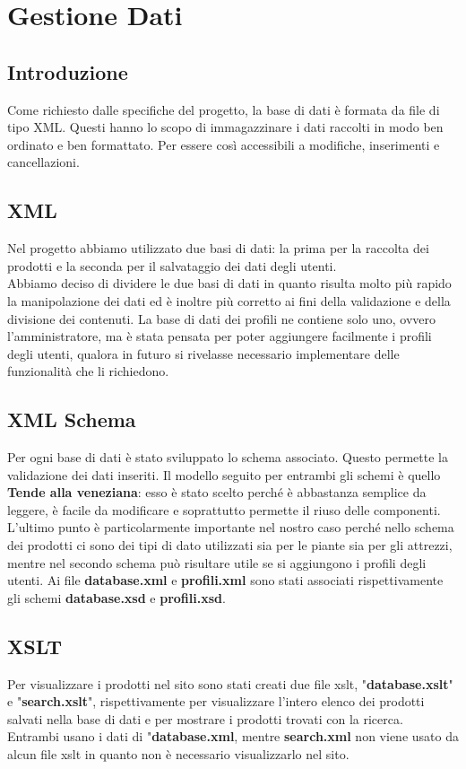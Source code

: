 \section{Gestione Dati}{
	\subsection{Introduzione}
	Come richiesto dalle specifiche del progetto, la base di dati è formata da file di tipo XML. Questi hanno lo scopo di immagazzinare i dati raccolti in modo ben ordinato e ben formattato. Per essere così accessibili a modifiche, inserimenti e cancellazioni.
	\subsection{XML}
	Nel progetto abbiamo utilizzato due basi di dati: la prima per la raccolta dei prodotti e la seconda per il salvataggio dei dati degli utenti.\\
Abbiamo deciso di dividere le due basi di dati in quanto risulta molto più rapido la manipolazione dei dati
ed è inoltre più corretto ai fini della validazione e della divisione dei contenuti.
La base di dati dei profili ne contiene solo uno, ovvero l'amministratore, ma è stata pensata per poter aggiungere facilmente i profili degli utenti, qualora in futuro si rivelasse necessario implementare delle funzionalità che li richiedono. 
	\subsection{XML Schema}
	Per ogni base di dati è stato sviluppato lo schema associato. Questo permette la validazione dei dati inseriti. Il modello seguito per entrambi gli schemi è quello \textbf{Tende alla veneziana}: esso è stato scelto perché è abbastanza semplice da leggere, è facile da modificare e soprattutto permette il riuso delle componenti. L'ultimo punto è particolarmente importante nel nostro caso perché nello schema dei prodotti ci sono dei tipi di dato utilizzati sia per le piante sia per gli attrezzi, mentre nel secondo schema può risultare utile se si aggiungono i profili degli utenti.
	Ai file \textbf{database.xml} e \textbf{profili.xml} sono stati associati rispettivamente gli schemi \textbf{database.xsd} e \textbf{profili.xsd}.
	\subsection{XSLT}
	Per visualizzare i prodotti nel sito sono stati creati due file xslt, "\textbf{database.xslt}" e "\textbf{search.xslt}", rispettivamente per visualizzare l'intero elenco dei prodotti salvati nella base di dati e per mostrare i prodotti trovati con la ricerca. Entrambi usano i dati di "\textbf{database.xml}, mentre \textbf{search.xml} non viene usato da alcun file xslt in quanto non è necessario visualizzarlo nel sito.
}